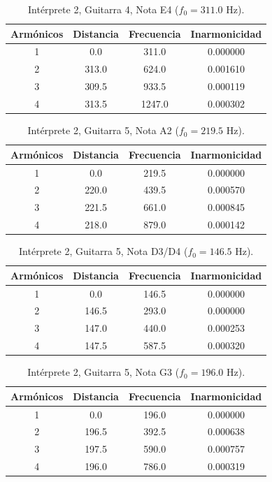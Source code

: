 \begin{table}[htbp]
  \centering
 \small
  \caption{Intérprete 2, Guitarra 4, Nota E4 ($f_0 = 311.0$ Hz).}
  \label{tab:interprete2_g4_e4}
  \begin{tabular}{cccc}
  \toprule
  Armónicos & Distancia & Frecuencia & Inarmonicidad \\
  \midrule
  1 & 0.0 & 311.0 & 0.000000 \\
  2 & 313.0 & 624.0 & 0.001610 \\
  3 & 309.5 & 933.5 & 0.000119 \\
  4 & 313.5 & 1247.0 & 0.000302 \\
  \bottomrule
  \end{tabular}
\end{table}

\begin{table}[htbp]
  \centering
 \small
  \caption{Intérprete 2, Guitarra 5, Nota A2 ($f_0 = 219.5$ Hz).}
  \label{tab:interprete2_g5_a2}
  \begin{tabular}{cccc}
  \toprule
  Armónicos & Distancia & Frecuencia & Inarmonicidad \\
  \midrule
  1 & 0.0 & 219.5 & 0.000000 \\
  2 & 220.0 & 439.5 & 0.000570 \\
  3 & 221.5 & 661.0 & 0.000845 \\
  4 & 218.0 & 879.0 & 0.000142 \\
  \bottomrule
  \end{tabular}
\end{table}

\begin{table}[htbp]
  \centering
 \small
  \caption{Intérprete 2, Guitarra 5, Nota D3/D4 ($f_0 = 146.5$ Hz).}
  \label{tab:interprete2_g5_d3_d4}
  \begin{tabular}{cccc}
  \toprule
  Armónicos & Distancia & Frecuencia & Inarmonicidad \\
  \midrule
  1 & 0.0 & 146.5 & 0.000000 \\
  2 & 146.5 & 293.0 & 0.000000 \\
  3 & 147.0 & 440.0 & 0.000253 \\
  4 & 147.5 & 587.5 & 0.000320 \\
  \bottomrule
  \end{tabular}
\end{table}

\begin{table}[htbp]
  \centering
 \small
  \caption{Intérprete 2, Guitarra 5, Nota G3 ($f_0 = 196.0$ Hz).}
  \label{tab:interprete2_g5_g3}
  \begin{tabular}{cccc}
  \toprule
  Armónicos & Distancia & Frecuencia & Inarmonicidad \\
  \midrule
  1 & 0.0 & 196.0 & 0.000000 \\
  2 & 196.5 & 392.5 & 0.000638 \\
  3 & 197.5 & 590.0 & 0.000757 \\
  4 & 196.0 & 786.0 & 0.000319 \\
  \bottomrule
  \end{tabular}
\end{table}

